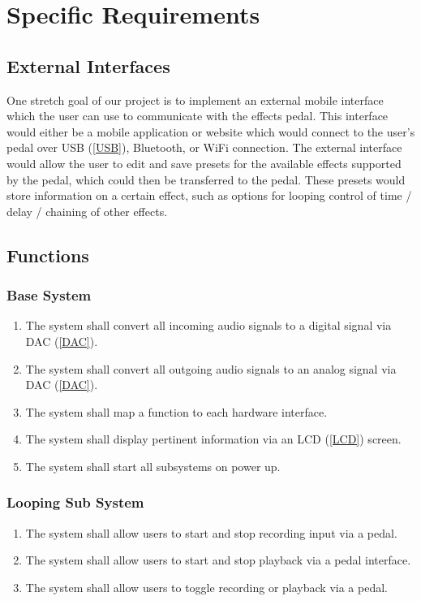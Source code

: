 \section{Specific Requirements}

\subsection{External Interfaces}
One stretch goal of our project is to implement an external mobile interface which the user can use to communicate with the effects pedal. This interface would either be a mobile application or website which would connect to the user's pedal over USB (\ref{USB}), Bluetooth, or WiFi connection. The external interface would allow the user to edit and save presets for the available effects supported by the pedal, which could then be transferred to the pedal. These presets would store information on a certain effect, such as options for looping control of time / delay / chaining of other effects. 

\subsection{Functions}
    \subsubsection{Base System}
    \begin{enumerate}[label=\alph*.]
        \item The system shall convert all incoming audio signals to a digital signal via DAC (\ref{DAC}). %
        \item The system shall convert all outgoing audio signals to an analog signal via DAC (\ref{DAC}).
        \item The system shall map a function to each hardware interface.
        \item The system shall display pertinent information via an LCD (\ref{LCD}) screen.
        \item The system shall start all subsystems on power up.

    \end{enumerate}
    
    \subsubsection{Looping Sub System}
        \begin{enumerate}[label=\alph*.]
            \item The system shall allow users to start and stop recording input via a pedal.
            \item The system shall allow users to start and stop playback via a pedal interface.
            \item The system shall allow users to toggle recording or playback via a pedal.


        \end{enumerate}
    

